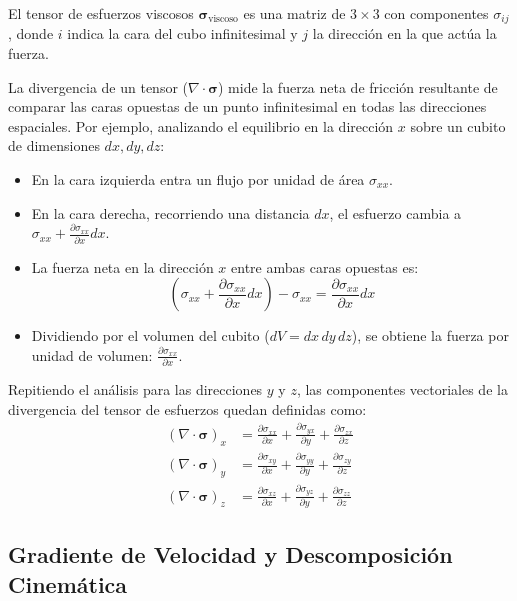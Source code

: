 \documentclass[11pt,letterpaper]{article}
\begin{document}
El tensor de esfuerzos viscosos $\boldsymbol{\sigma}_{\text{viscoso}}$ es una matriz de $3 \times 3$ con componentes $\sigma_{ij}$, donde $i$ indica la cara del cubo infinitesimal y $j$ la dirección en la que actúa la fuerza. 

La divergencia de un tensor ($\nabla \cdot \boldsymbol{\sigma}$) mide la fuerza neta de fricción resultante de comparar las caras opuestas de un punto infinitesimal en todas las direcciones espaciales. Por ejemplo, analizando el equilibrio en la dirección $x$ sobre un cubito de dimensiones $dx, dy, dz$:
\begin{itemize}
    \item En la cara izquierda entra un flujo por unidad de área $\sigma_{xx}$.
    \item En la cara derecha, recorriendo una distancia $dx$, el esfuerzo cambia a $\sigma_{xx} + \frac{\partial \sigma_{xx}}{\partial x} dx$.
    \item La fuerza neta en la dirección $x$ entre ambas caras opuestas es:
    \begin{equation}
        \left(\sigma_{xx} + \frac{\partial \sigma_{xx}}{\partial x} dx\right) - \sigma_{xx} = \frac{\partial \sigma_{xx}}{\partial x} dx
    \end{equation}
    \item Dividiendo por el volumen del cubito ($dV = dx \, dy \, dz$), se obtiene la fuerza por unidad de volumen: $\frac{\partial \sigma_{xx}}{\partial x}$.
\end{itemize}

Repitiendo el análisis para las direcciones $y$ y $z$, las componentes vectoriales de la divergencia del tensor de esfuerzos quedan definidas como:
\begin{align}
    (\nabla \cdot \boldsymbol{\sigma})_x &= \frac{\partial \sigma_{xx}}{\partial x} + \frac{\partial \sigma_{yx}}{\partial y} + \frac{\partial \sigma_{zx}}{\partial z} \\
    (\nabla \cdot \boldsymbol{\sigma})_y &= \frac{\partial \sigma_{xy}}{\partial x} + \frac{\partial \sigma_{yy}}{\partial y} + \frac{\partial \sigma_{zy}}{\partial z} \\
    (\nabla \cdot \boldsymbol{\sigma})_z &= \frac{\partial \sigma_{xz}}{\partial x} + \frac{\partial \sigma_{yz}}{\partial y} + \frac{\partial \sigma_{zz}}{\partial z}
\end{align}

\subsection{Gradiente de Velocidad y Descomposición Cinemática}
\end{document}
